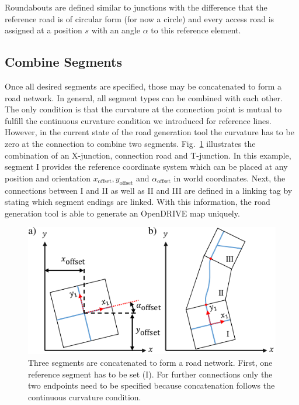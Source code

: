 \documentclass[a4paper, 10pt, conference]{ieeeconf}      %
\begin{document}
Roundabouts are defined similar to junctions with the difference that the reference road is of circular form (for now a circle) and every access road is assigned at a position $s$ with an angle $\alpha$ to this reference element.

\subsection{Combine Segments}
Once all desired segments are specified, those may be concatenated to form a road network. In general, all segment types can be combined with each other. The only condition is that the curvature at the connection point is mutual to fulfill the continuous curvature condition we introduced for reference lines. However, in the current state of the road generation tool the curvature has to be zero at the connection to combine two segments. Fig.~\ref{fig_concatSeg} illustrates the combination of an X-junction, connection road and T-junction. In this example, segment I provides the reference coordinate system which can be placed at any position and orientation $x_\text{offset}, y_\text{offset}$ and $\alpha_\text{offset}$ in world coordinates. Next, the connections between I and II as well as II and III are defined in a linking tag by stating which segment endings are linked. With this information, the road generation tool is able to generate an OpenDRIVE map uniquely.
\begin{figure}[thpb] 		
	\centering
	\includegraphics{fig/concatSegments.pdf}
	\caption{Three segments are concatenated to form a road network. First, one reference segment has to be set (I). For further connections only the two endpoints need to be specified because concatenation follows the continuous curvature condition.}
	\label{fig_concatSeg}
\end{figure}
\end{document}
